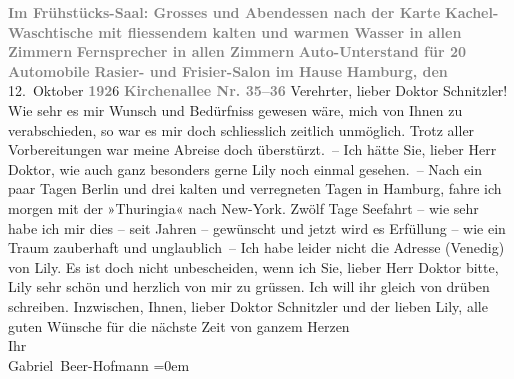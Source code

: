 \begin{ledgroupsized}[t]{13cm}
           \pstart
           \centering{}\textcolor{gray}{\textbf{Im Frühstücks-Saal: Grosses und Abendessen nach der
                     Karte}}\pend
           \pstart
           \noindent{}\centering{}\textcolor{gray}{\textbf{Kachel-Waschtische mit fliessendem kalten und warmen Wasser
                     in allen Zimmern}}\pend
           \pstart
           \noindent{}\textcolor{gray}{\textbf{Fernsprecher in allen Zimmern}}\pend
           \pstart
           \textcolor{gray}{\textbf{Auto-Unterstand für 20 Automobile}}\pend
           \pstart
           \textcolor{gray}{\textbf{Rasier- und Frisier-Salon im Hause}}\pend
           \pstart
           \raggedleft{}\textcolor{gray}{\textbf{Hamburg, den}}{ }12. Oktober \textcolor{gray}{\textbf{192}}6\pend
           \pstart
           \raggedleft{}\textcolor{gray}{\textbf{Kirchenallee Nr. 35–36}}\pend
           \pstart{}Verehrter, lieber Doktor Schnitzler!\pend\pstart
           Wie sehr es mir Wunsch und Bedürfniss gewesen wäre, mich von Ihnen zu verabschieden,
               so war es mir doch schliesslich zeitlich unmöglich. Trotz aller Vorbereitungen war
               meine Abreise doch überstürzt. –\pend
           \pstart
           Ich hätte Sie, lieber Herr Doktor, wie auch ganz besonders gerne Lily noch einmal gesehen. –\pend
           \pstart
           Nach ein paar Tagen Berlin und drei kalten und
               verregneten Tagen in Hamburg, fahre ich morgen
               mit der »Thuringia« nach New-York.\pend
           \pstart
           Zwölf Tage Seefahrt – wie sehr habe ich mir dies – seit Jahren – gewünscht und jetzt
               wird es Erfüllung – wie ein Traum zauberhaft und unglaublich –\pend
           \pstart
           Ich habe leider nicht die Adresse (Venedig) von
                  Lily.\pend
           \pstart
           Es ist doch nicht unbescheiden, wenn ich Sie, lieber Herr Doktor {\pb}bitte, Lily sehr schön und herzlich von mir zu grüssen. Ich will ihr
               gleich von drüben schreiben.\pend
           \pstart
           Inzwischen, Ihnen, lieber Doktor Schnitzler und der lieben Lily, alle guten Wünsche für die nächste Zeit\pend
           \pstart
           von ganzem Herzen{\\[\baselineskip]}Ihr{\\[\baselineskip]}\spacefill\mbox{Gabriel Beer-Hofmann}\pend
           \leftskip=0em{}
         
         \endnumbering{}\end{ledgroupsized}  \newcommand{\dateiname}{L02479}\newcommand{\titel}{Gabriel Beer-Hofmann an Arthur Schnitzler, 12. 10. 1926}\newcommand{\editorInnen}{Martin Anton Müller und Gerd-Hermann Susen}
      